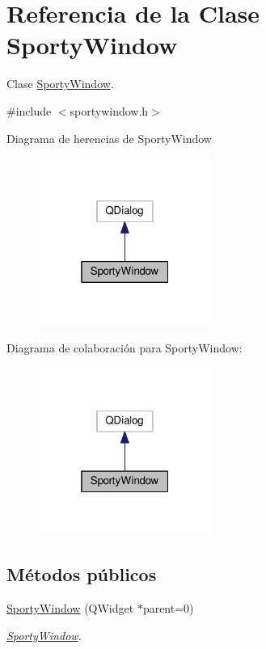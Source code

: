 \hypertarget{class_sporty_window}{}\section{Referencia de la Clase Sporty\+Window}
\label{class_sporty_window}


Clase \hyperlink{class_sporty_window}{Sporty\+Window}.  




{\ttfamily \#include $<$sportywindow.\+h$>$}



Diagrama de herencias de Sporty\+Window\nopagebreak
\begin{figure}[H]
\begin{center}
\leavevmode
\includegraphics[width=160pt]{class_sporty_window__inherit__graph}
\end{center}
\end{figure}


Diagrama de colaboración para Sporty\+Window\+:\nopagebreak
\begin{figure}[H]
\begin{center}
\leavevmode
\includegraphics[width=160pt]{class_sporty_window__coll__graph}
\end{center}
\end{figure}
\subsection*{Métodos públicos}
\begin{DoxyCompactItemize}
\item 
\hyperlink{class_sporty_window_a9f7df59d49800c0b226b19a4ee083f34}{Sporty\+Window} (Q\+Widget $\ast$parent=0)
\begin{DoxyCompactList}\small\item\em \hyperlink{class_sporty_window}{Sporty\+Window}. \end{DoxyCompactList}\end{DoxyCompactItemize}


